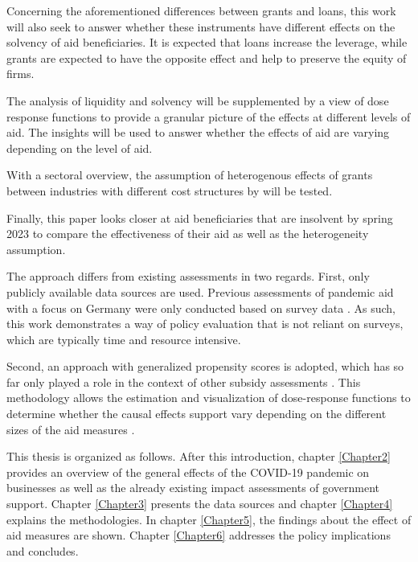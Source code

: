 Concerning the aforementioned differences between grants and loans, this work will also seek to answer whether these instruments have different effects on the solvency of aid beneficiaries. It is expected that loans increase the leverage, while grants are expected to have the opposite effect and help to preserve the equity of firms.

The analysis of liquidity and solvency will be supplemented by a view of dose response functions to provide a granular picture of the effects at different levels of aid. The insights will be used to answer whether the effects of aid are varying depending on the level of aid. 

With a sectoral overview, the assumption of heterogenous effects of grants between industries with different cost structures by \parencite{bischof_bedeutung_2021} will be tested.

Finally, this paper looks closer at aid beneficiaries that are insolvent by spring 2023 to compare the effectiveness of their aid as well as the heterogeneity assumption.

The approach differs from existing assessments in two regards. First, only publicly available data sources are used. Previous assessments of pandemic aid with a focus on Germany were only conducted based on survey data \parencite{marek_impact_2022,bertschek_german_2022,dorr_small_2022,bischof_bedeutung_2021}. As such, this work demonstrates a way of policy evaluation that is not reliant on surveys, which are typically time and resource intensive.

Second, an approach with generalized propensity scores is adopted, which has so far only played a role in the context of other subsidy assessments \parencite{selebaj_effects_2021,carboni_effect_2017}. This methodology allows the estimation and visualization of dose-response functions to determine whether the causal effects support vary depending on the different sizes of the aid measures \parencite{selebaj_effects_2021}.

This thesis is organized as follows. After this introduction, chapter \ref{Chapter2} provides an overview of the general effects of the COVID-19 pandemic on businesses as well as the already existing impact assessments of government support. Chapter \ref{Chapter3} presents the data sources and chapter \ref{Chapter4} explains the methodologies. In chapter \ref{Chapter5}, the findings about the effect of aid measures are shown. Chapter \ref{Chapter6} addresses the policy implications and concludes. 





